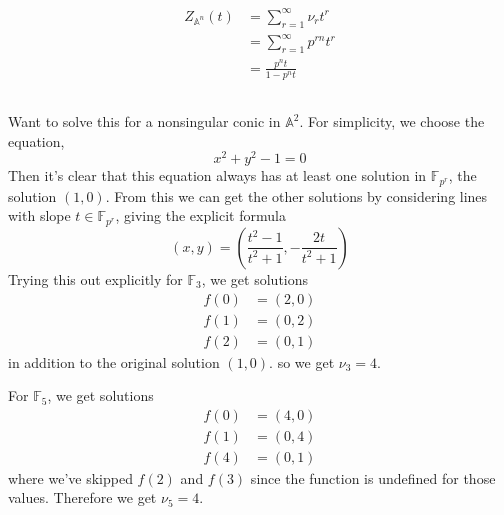 \documentclass{article}
\begin{document}
\subsection{}
\begin{subequations}
\begin{align}
Z_{\mathbb{A}^{n}}(t) & = \sum_{r=1}^{\infty} \nu_{r}t^{r} \\
& = \sum_{r=1}^{\infty}p^{rn}t^{r} \\
& = \frac{p^{n}t}{1-p^{n}t}
\end{align}
\end{subequations}

\subsection{}
Want to solve this for a nonsingular conic in \(\mathbb{A}^{2}\). For simplicity, we choose the equation,
\begin{equation}
x^{2} + y^{2} - 1 = 0
\end{equation}
Then it's clear that this equation always has at least one solution in \(\mathbb{F}_{p^{r}}\), the solution \((1, 0)\). From this we can get the other solutions by considering lines with slope \(t \in \mathbb{F}_{p^{r}}\), giving the explicit formula
\begin{equation}
(x, y) = \left(\frac{t^{2} - 1}{t^{2} + 1}, -\frac{2t}{t^{2}+1}\right)
\end{equation}
Trying this out explicitly for \(\mathbb{F}_{3}\), we get solutions
\begin{subequations}
\begin{align}
f(0) & = (2, 0) \\
f(1) & = (0, 2) \\
f(2) & = (0, 1)
\end{align}
\end{subequations}
in addition to the original solution \((1, 0)\).
so we get \(\nu_{3} = 4\).

For \(\mathbb{F}_{5}\), we get solutions
\begin{subequations}
\begin{align}
f(0) & = (4, 0) \\
f(1) & = (0, 4) \\
f(4) & = (0, 1)
\end{align}
\end{subequations}
where we've skipped \(f(2)\) and \(f(3)\) since the function is undefined for those values. Therefore we get \(\nu_{5} = 4\).
\end{document}
